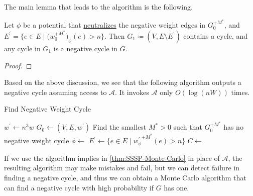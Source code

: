 The main lemma that leads to the algorithm is the following.

\begin{lemma}\label{lma:SSSP-detect-negative-cycle}
	Let \(\phi \) be a potential that \hyperref[def:neutralize]{neutralizes} the negative weight edges in \(G_0^{+M^{\ast} }\), and \(E^{\prime} = \{ e\in E \mid \big(w_0^{+M^{\ast} }\big)_{\phi } (e) > n \} \). Then \(G_1 \coloneqq (V, E \setminus E^{\prime} )\) contains a cycle, and any cycle in \(G_1\) is a negative cycle in \(G\).
\end{lemma}
\begin{proof}
\end{proof}

Based on the above discussion, we see that the following algorithm outputs a negative cycle assuming access to \(\mathcal{A} \). It invokes \(\mathcal{A} \) only \(O(\log (nW))\) times.

\begin{algorithm}[H]\label{algo:find-negative-cyele}
	\DontPrintSemicolon{}
	\caption{Find Negative Weight Cycle}
	\BlankLine

	\(w^{\prime} \gets n^3 w\)\;
	\(G_0 \gets (V, E, w^{\prime} )\)\;
	Find the smallest \(M^{\ast} > 0\) such that \(G_0^{+M^{\ast} }\) has no negative weight cycle
	\(\phi \gets \)
	\(E^{\prime} \gets \{ e \in E \mid {w^{\prime}_{\phi }}^{+ M^{\ast}} (e) > n \} \)\;
	\(C \gets\)\;
	\;
\end{algorithm}

If we use the algorithm implies in \autoref{thm:SSSP-Monte-Carlo} in place of \(\mathcal{A} \), the resulting algorithm may make mistakes and fail, but we can detect failure in finding a negative cycle, and thus we can obtain a Monte Carlo algorithm that can find a negative cycle with high probability if \(G\) has one.